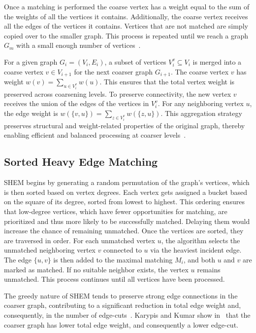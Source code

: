 Once a matching is performed the coarse vertex has a weight equal to the sum of the weights of all the vertices it contains. Additionally, the coarse vertex receives all the edges of the vertices it contains. Vertices that are not matched are simply copied over to the smaller graph. This process is repeated until we reach a graph $G_m$ with a small enough number of vertices~\cite{karypis_analysis_1995}.

For a given graph $G_i = (V_i, E_i)$, a subset of vertices $V^v_i \subseteq V_i$ is merged into a coarse vertex $v \in V_{i+1}$ for the next coarser graph $G_{i+1}$. The coarse vertex $v$ has weight $w(v) = \sum_{u \in V^v_i} w(u)$. This ensures that the total vertex weight is preserved across coarsening levels. To preserve connectivity, the new vertex $v$ receives the union of the edges of the vertices in $V^v_i$. For any neighboring vertex $u$, the edge weight is $w(\{v,u\}) = \sum_{z\in V^v_i}w(\{z,u\})$. This aggregation strategy preserves structural and weight-related properties of the original graph, thereby enabling efficient and balanced processing at coarser levels~\cite{karypis_multilevelk-way_1998}.

\subsection{Sorted Heavy Edge Matching}
SHEM begins by generating a random permutation of the graph's vertices, which is then sorted based on vertex degrees. Each vertex gets assigned a bucket based on the square of its degree, sorted from lowest to highest. This ordering ensures that low-degree vertices, which have fewer opportunities for matching, are prioritized and thus more likely to be successfully matched. Delaying them would increase the chance of remaining unmatched. Once the vertices are sorted, they are traversed in order. For each unmatched vertex $u$, the algorithm selects the unmatched neighboring vertex $v$ connected to $u$ via the heaviest incident edge. The edge $\{u,v\}$ is then added to the maximal matching $M_i$, and both $u$ and $v$ are marked as matched. If no suitable neighbor exists, the vertex $u$ remains unmatched. This process continues until all vertices have been processed.

The greedy nature of SHEM tends to preserve strong edge connections in the coarser graph, contributing to a significant reduction in total edge weight and, consequently, in the number of edge-cuts~\cite{KarypisGeorge1998AFaH, karypis_parallel_1999}. Karypis and Kumar show in~\cite{karypis_analysis_1995} that the coarser graph has lower total edge weight, and consequently a lower edge-cut. 

